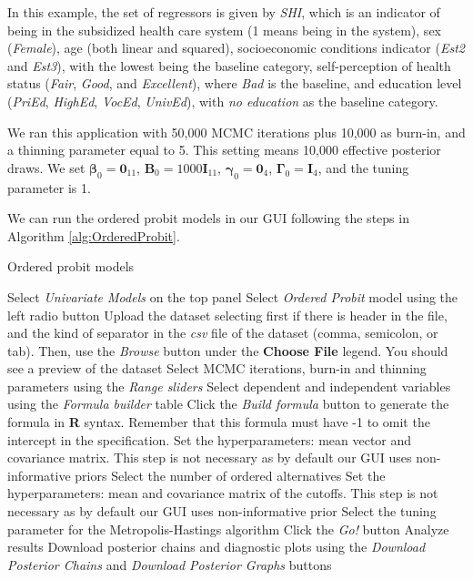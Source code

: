 In this example, the set of regressors is given by \textit{SHI}, which is an indicator of being in the subsidized health care system (1 means being in the system), sex (\textit{Female}), age (both linear and squared), socioeconomic conditions indicator (\textit{Est2} and \textit{Est3}), with the lowest being the baseline category, self-perception of health status (\textit{Fair}, \textit{Good}, and \textit{Excellent}), where \textit{Bad} is the baseline, and education level (\textit{PriEd}, \textit{HighEd}, \textit{VocEd}, \textit{UnivEd}), with \textit{no education} as the baseline category.

We ran this application with 50,000 MCMC iterations plus 10,000 as burn-in, and a thinning parameter equal to 5. This setting means 10,000 effective posterior draws. We set $\bm{\beta}_0 = \bm{0}_{11}$, $\bm{B}_0 = 1000\bm{I}_{11}$, $\bm{\gamma}_0 = \bm{0}_4$, $\bm{\Gamma}_0 = \bm{I}_4$, and the tuning parameter is 1.

We can run the ordered probit models in our GUI following the steps in Algorithm \ref{alg:OrderedProbit}.
 
\begin{algorithm}[h!]
	\caption{Ordered probit models}\label{alg:OrderedProbit}
	\begin{algorithmic}[1]  		 			
		\State Select \textit{Univariate Models} on the top panel
		\State Select \textit{Ordered Probit} model using the left radio button
		\State Upload the dataset selecting first if there is header in the file, and the kind of separator in the \textit{csv} file of the dataset (comma, semicolon, or tab). Then, use the \textit{Browse} button under the \textbf{Choose File} legend. You should see a preview of the dataset
		\State Select MCMC iterations, burn-in and thinning parameters using the \textit{Range sliders}
		\State Select dependent and independent variables using the \textit{Formula builder} table
		\State Click the \textit{Build formula} button to generate the formula in \textbf{R} syntax. Remember that this formula must have -1 to omit the intercept in the specification.
		\State Set the hyperparameters: mean vector and covariance matrix. This step is not necessary as by default our GUI uses non-informative priors
		\State Select the number of ordered alternatives
		\State Set the hyperparameters: mean and covariance matrix of the cutoffs. This step is not necessary as by default our GUI uses non-informative prior 
		\State Select the tuning parameter for the Metropolis-Hastings algorithm 
		\State Click the \textit{Go!} button
		\State Analyze results
		\State Download posterior chains and diagnostic plots using the \textit{Download Posterior Chains} and \textit{Download Posterior Graphs} buttons
	\end{algorithmic} 
\end{algorithm}

